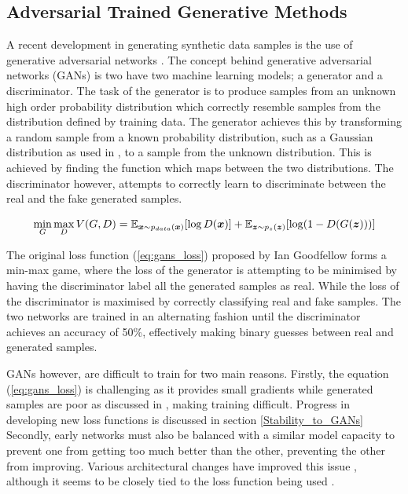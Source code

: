 \documentclass[12pt]{article}
\begin{document}
\subsection{Adversarial Trained Generative Methods}
A recent development in generating synthetic data samples is the use of generative adversarial networks \cite{Goodfellow2014}.
The concept behind generative adversarial networks (GANs) is two have two machine learning models; a generator and a discriminator.
The task of the generator is to produce samples from an unknown high order probability distribution which correctly resemble samples from the distribution defined by training data.
The generator achieves this by transforming a random sample from a known probability distribution, such as a Gaussian distribution as used in \cite{Goodfellow2014}, to a sample from the unknown distribution.
This is achieved by finding the function which maps between the two distributions.
The discriminator however, attempts to correctly learn to discriminate between the real and the fake generated samples.

\begin{equation} \label{eq:gans_loss}
    \min_{G} \max_{D} V(G, D) = \mathbb{E}_{{\boldsymbol{{x}}} \sim p_{data}({\boldsymbol{{x}}})} [\log D({\boldsymbol{{x}}})]
                              + \mathbb{E}_{{\boldsymbol{{z}}} \sim p_{z}({\boldsymbol{{z}}})} [\log (1 - D(G({\boldsymbol{{z}}})))]
\end{equation}
\quad

\noindent The original loss function (\ref{eq:gans_loss}) proposed by Ian Goodfellow forms a min-max game, where the loss of the generator is attempting to be minimised by having the discriminator label all the generated samples as real.
While the loss of the discriminator is maximised by correctly classifying real and fake samples.
The two networks are trained in an alternating fashion until the discriminator achieves an accuracy of 50\%, effectively making binary guesses between real and generated samples.

GANs however, are difficult to train for two main reasons.
Firstly, the equation (\ref{eq:gans_loss}) is challenging as it provides small gradients while generated samples are poor as discussed in \cite{Goodfellow2014}, making training difficult.
Progress in developing new loss functions is discussed in section \ref{Stability_to_GANs}
Secondly, early networks must also be balanced with a similar model capacity to prevent one from getting too much better than the other, preventing the other from improving.
Various architectural changes have improved this issue \cite{Radford2016, Zhang2018}, although it seems to be closely tied to the loss function being used \cite{Gulrajani2017}.
\end{document}
